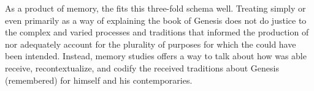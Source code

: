 As a product of memory, the \ga fits this three-fold schema well. Treating \ga simply or even primarily as a way of explaining the book of Genesis does not do justice to the complex and varied processes and traditions that informed the production of \ga nor adequately account for the plurality of purposes for which the \ga could have been intended. Instead, memory studies offers a way to talk about how \ga was able receive, recontextualize, and codify the received traditions about Genesis (remembered) for himself and his contemporaries.


